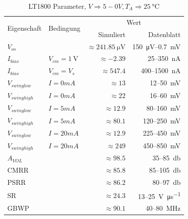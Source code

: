 \documentclass[
	ngerman,
	parskip=half,
	twocolumn,
	DIV=calc,
	]{scrartcl}
\begin{document}
	\begin{table}[h!]
		\centering
		\begin{tabular}{l l r r}
			\toprule
			\multirow{2}{*}{Eigenschaft} & \multirow{2}{*}{Bedingung} &
			\multicolumn{2}{c}{Wert} \\
			&& Simuliert & Datenblatt \cite{datasheet:LT1800} \\
			\midrule		
			
			$V_{os}$											  			     && $ \approx  \SI{241.85}{\micro\volt} $ & \SI{150}{\micro\volt}--\SI{0.7}{\milli\volt} \\			
			$I_{bias}$					          &$V_{cm} = \SI{1}{\volt}$ & $\approx -2.39$         & 25--\SI{350}{\nano\ampere} \\			
			$I_{bias}$ 					  		 & $V_{cm} = V_{s}$	   & $\approx 547.4$         & 400--\SI{1500}{\nano\ampere} \\		
			$V_{swing low}	 $		 & $I = 0mA$& $ \approx 13 $ 			& 12--\SI{50}{\milli\volt}  \\ 
			$V_{swing high} $		 &	$ I = 0mA$& $ \approx 22 $    		& 16--\SI{60}{\milli\volt} \\
			$V_{swing low}  $		 &$ I = 5mA$	& $  \approx 12.9$   & 80--\SI{160}{\milli\volt}    \\ 
			$V_{swing high}$		 & $I = 5mA$ & $ \approx   80.1$   & 120--\SI{250}{\milli\volt}   \\
		    $V_{swing low}$		& $I = 20mA$ & $  \approx  12.9 $   & 225--\SI{450}{\milli\volt}    \\ 
			$V_{swing high}$		& $ I = 20mA$ & $ \approx   249 $   & 450--\SI{850}{\milli\volt}  \\
		    $A_{VOL}$					&									  & $\approx 98.5 $				& 35--\SI{85}{\decibel} \\
			CMRR 							&									   & $\approx 85.8$ 		  & 85--\SI{105}{\decibel}\\
			PSRR 							&										& $\approx 86.2$ 			& 80--\SI{97}{\decibel} \\
			SR 									&									  & $ \approx 24.3 $ 		& 13--\SI{25}{\volt\per\micro\second}\\
			GBWP 							&									  & $\approx 90.1$ 				& 40--\SI{80}{\mega\hertz}\\
			\bottomrule
		\end{tabular}
		\caption[LT1800 Parameter]{LT1800 Parameter, $V \Rightarrow 5-0V, T_A \Rightarrow  \SI{25}{\celsius}  $}
		\label{tab:opamp-LT1800}
	\end{table}
\end{document}
